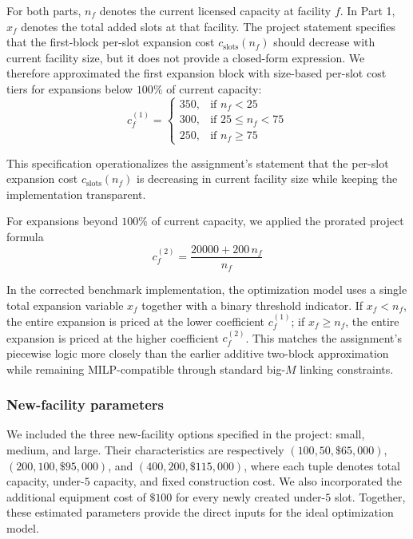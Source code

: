 \documentclass[11pt]{article}
\newcommand{\1}{\mathbb{I}}
\begin{document}
For both parts, \(n_f\) denotes the current licensed capacity at facility \(f\). In Part 1, \(x_f\) denotes the total added slots at that facility. The project statement specifies that the first-block per-slot expansion cost \(c_{\text{slots}}(n_f)\) should decrease with current facility size, but it does not provide a closed-form expression. We therefore approximated the first expansion block with size-based per-slot cost tiers for expansions below \(100\%\) of current capacity:
\[
c_f^{(1)} =
\begin{cases}
350, & \text{if } n_f < 25\\
300, & \text{if } 25 \le n_f < 75\\
250, & \text{if } n_f \ge 75
\end{cases}
\]

This specification operationalizes the assignment's statement that the per-slot expansion cost \(c_{\text{slots}}(n_f)\) is decreasing in current facility size while keeping the implementation transparent.

For expansions beyond \(100\%\) of current capacity, we applied the prorated project formula
\[
c_f^{(2)} = \frac{20000 + 200\,n_f}{n_f}
\]

In the corrected benchmark implementation, the optimization model uses a single total expansion variable \(x_f\) together with a binary threshold indicator. If \(x_f < n_f\), the entire expansion is priced at the lower coefficient \(c_f^{(1)}\); if \(x_f \ge n_f\), the entire expansion is priced at the higher coefficient \(c_f^{(2)}\). This matches the assignment's piecewise logic more closely than the earlier additive two-block approximation while remaining MILP-compatible through standard big-\(M\) linking constraints.

\subsubsection{New-facility parameters}

We included the three new-facility options specified in the project: small, medium, and large. Their characteristics are respectively \((100,50,\$65{,}000)\), \((200,100,\$95{,}000)\), and \((400,200,\$115{,}000)\), where each tuple denotes total capacity, under-\(5\) capacity, and fixed construction cost. We also incorporated the additional equipment cost of \(\$100\) for every newly created under-\(5\) slot. Together, these estimated parameters provide the direct inputs for the ideal optimization model. 
\end{document}
